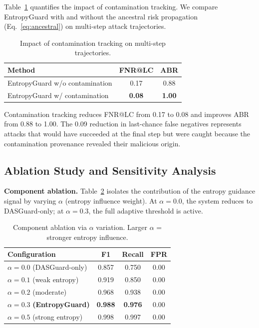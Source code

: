 \documentclass[conference]{IEEEtran}
\begin{document}
Table~\ref{tab:contamination} quantifies the impact of contamination tracking. We compare EntropyGuard with and without the ancestral risk propagation (Eq.~\ref{eq:ancestral}) on multi-step attack trajectories.

\begin{table}[h]
\centering
\caption{Impact of contamination tracking on multi-step trajectories.}
\label{tab:contamination}
\begin{tabular}{lcc}
\toprule
Method & FNR@LC & ABR \\
\midrule
EntropyGuard w/o contamination & 0.17 & 0.88 \\
EntropyGuard w/ contamination & \textbf{0.08} & \textbf{1.00} \\
\bottomrule
\end{tabular}
\end{table}

Contamination tracking reduces FNR@LC from 0.17 to 0.08 and improves ABR from 0.88 to 1.00. The 0.09 reduction in last-chance false negatives represents attacks that would have succeeded at the final step but were caught because the contamination provenance revealed their malicious origin.

\subsection{Ablation Study and Sensitivity Analysis}
\label{sec:exp_ablation}

\textbf{Component ablation.} Table~\ref{tab:ablation} isolates the contribution of the entropy guidance signal by varying $\alpha$ (entropy influence weight). At $\alpha=0.0$, the system reduces to DASGuard-only; at $\alpha=0.3$, the full adaptive threshold is active.

\begin{table}[h]
\centering
\caption{Component ablation via $\alpha$ variation. Larger $\alpha$ = stronger entropy influence.}
\label{tab:ablation}
\begin{tabular}{lccc}
\toprule
Configuration & F1 & Recall & FPR \\
\midrule
$\alpha=0.0$ (DASGuard-only) & 0.857 & 0.750 & 0.00 \\
$\alpha=0.1$ (weak entropy) & 0.919 & 0.850 & 0.00 \\
$\alpha=0.2$ (moderate) & 0.968 & 0.938 & 0.00 \\
$\alpha=0.3$ \textbf{(EntropyGuard)} & \textbf{0.988} & \textbf{0.976} & 0.00 \\
$\alpha=0.5$ (strong entropy) & 0.998 & 0.997 & 0.00 \\
\bottomrule
\end{tabular}
\end{table}
\end{document}
